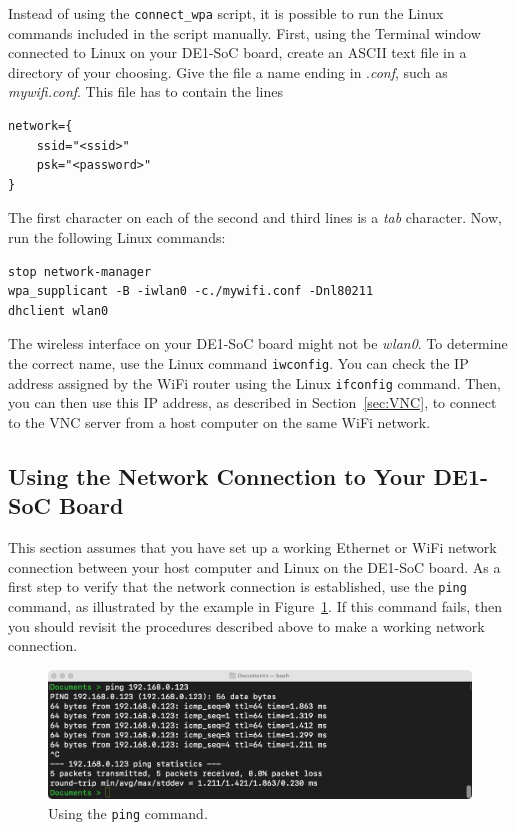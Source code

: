 \documentclass[11pt, twoside, pdftex]{article}
\begin{document}
Instead of using the \texttt{connect\_wpa} script, it is possible to run the Linux commands
included in the script manually. First, using the Terminal window connected to Linux on
your DE1-SoC board, create an ASCII text file in a directory of your choosing. Give the file 
a name ending in .{\it conf}, such as {\it mywifi.conf}. This file has to contain the lines

\begin{lstlisting}
network={
	ssid="<ssid>"
	psk="<password>"
}
\end{lstlisting}

The first character on each of the second and third lines is a {\it tab} character.
Now, run the following Linux commands:

\begin{lstlisting}
stop network-manager
wpa_supplicant -B -iwlan0 -c./mywifi.conf -Dnl80211
dhclient wlan0
\end{lstlisting}

The wireless interface on your DE1-SoC board might not be {\it wlan0}. To
determine the correct name, use the Linux command \texttt{iwconfig}. You can check the IP address 
assigned by the WiFi router using the Linux \texttt{ifconfig} command. Then, you can then use 
this IP address, as described in Section~\ref{sec:VNC}, to connect to the VNC server from a 
host computer on the same WiFi network.

\subsection{Using the Network Connection to Your DE1-SoC Board}
\label{sec:connecting}

This section assumes that you have set up a working Ethernet or WiFi network connection 
between your host computer and Linux on the DE1-SoC board.  As a first step to verify that
the network connection is established, use the \texttt{ping} command, as illustrated by the
example in Figure~\ref{fig:ping}. If this command fails, then you should revisit the procedures
described above to make a working network connection.

\begin{figure}[H]
   \begin{center}
       \includegraphics[scale=0.4]{figures/ping.png}
   \end{center}
   \caption{Using the \texttt{ping} command.}
	\label{fig:ping}
\end{figure}
\end{document}
